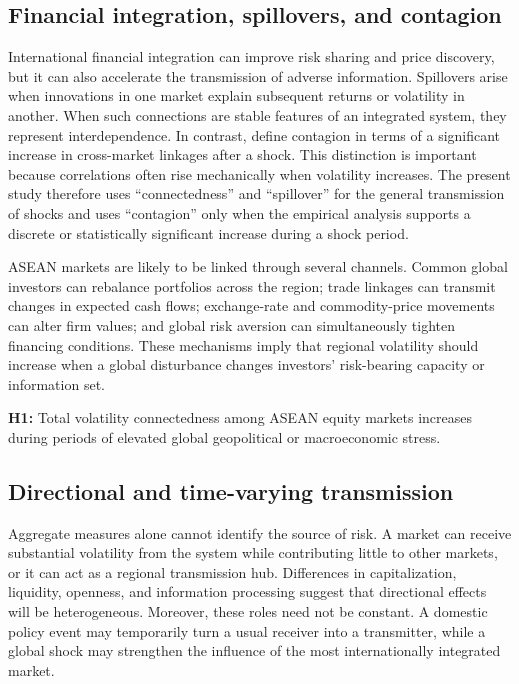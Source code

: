 \documentclass[12pt,a4paper]{article}
\begin{document}
\subsection{Financial integration, spillovers, and contagion}

International financial integration can improve risk sharing and price discovery, but it can also accelerate the transmission of adverse information. Spillovers arise when innovations in one market explain subsequent returns or volatility in another. When such connections are stable features of an integrated system, they represent interdependence. In contrast, \citet{ForbesRigobon2002} define contagion in terms of a significant increase in cross-market linkages after a shock. This distinction is important because correlations often rise mechanically when volatility increases. The present study therefore uses ``connectedness'' and ``spillover'' for the general transmission of shocks and uses ``contagion'' only when the empirical analysis supports a discrete or statistically significant increase during a shock period.

ASEAN markets are likely to be linked through several channels. Common global investors can rebalance portfolios across the region; trade linkages can transmit changes in expected cash flows; exchange-rate and commodity-price movements can alter firm values; and global risk aversion can simultaneously tighten financing conditions. These mechanisms imply that regional volatility should increase when a global disturbance changes investors' risk-bearing capacity or information set.

\textbf{H1:} Total volatility connectedness among ASEAN equity markets increases during periods of elevated global geopolitical or macroeconomic stress.

\subsection{Directional and time-varying transmission}

Aggregate measures alone cannot identify the source of risk. A market can receive substantial volatility from the system while contributing little to other markets, or it can act as a regional transmission hub. Differences in capitalization, liquidity, openness, and information processing suggest that directional effects will be heterogeneous. Moreover, these roles need not be constant. A domestic policy event may temporarily turn a usual receiver into a transmitter, while a global shock may strengthen the influence of the most internationally integrated market.
\end{document}
